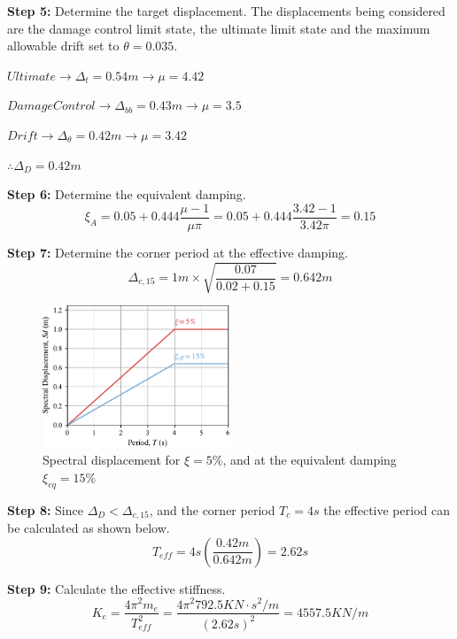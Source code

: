 \textbf{Step 5:} Determine the target displacement. The displacements being considered are the damage control limit state, the ultimate limit state and the maximum allowable drift set to $\theta=0.035$.

$Ultimate \to \Delta_{t}=0.54 m \to \mu=4.42$

$Damage Control \to \Delta_{bb} =0.43 m \to \mu=3.5$

$Drift \to \Delta_{\theta}=0.42 m \to \mu=3.42$

$\therefore \Delta_{D}=0.42m$

\textbf{Step 6:} Determine the equivalent damping.
\begin{displaymath}
    \xi_{A}=0.05+0.444\frac{\mu-1}{\mu\pi}=0.05+0.444\frac{3.42-1}{3.42\pi}=0.15
\end{displaymath}

\textbf{Step 7:} Determine the corner period at the effective damping.
\begin{displaymath}
    \Delta_{c,15}=1 m \times \sqrt{\frac{0.07}{0.02+0.15}} = 0.642 m
\end{displaymath}

\begin{figure}[htbp]
	\centering
	\includegraphics[width=0.5\textwidth]{VAC Thesis 2.0/Chapter-6/figs/SD_Design_5.pdf}
	\caption{Spectral displacement for $\xi=5\%$, and at the equivalent damping $\xi_{eq}=15\%$}
	\label{fig:force_displacement_design}
\end{figure}

\textbf{Step 8:} Since $\Delta_{D}<\Delta_{c,15}$, and the corner period $T_{c}=4s$ the effective period can be calculated as shown below.
\begin{displaymath}
    T_{eff}=4s \left(\frac{0.42m}{0.642m}\right)=2.62s
\end{displaymath}

\textbf{Step 9:} Calculate the effective stiffness.
\begin{displaymath}
    K_{e}=\frac{4\pi^2m_{e}}{T_{eff}^2}=\frac{4\pi^2 792.5 KN\cdot s^2/m}{(2.62s)^2}=4557.5 KN/m
\end{displaymath}

